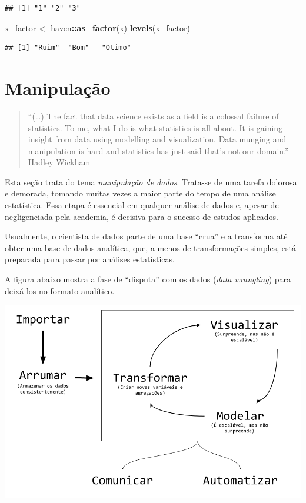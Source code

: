 \documentclass[
]{book}
\newenvironment{Shaded}{\begin{snugshade}}{\end{snugshade}}
\newcommand{\KeywordTok}[1]{\textcolor[rgb]{0.13,0.29,0.53}{\textbf{#1}}}
\newcommand{\NormalTok}[1]{#1}
\newcommand{\OperatorTok}[1]{\textcolor[rgb]{0.81,0.36,0.00}{\textbf{#1}}}
\newcommand{\StringTok}[1]{\textcolor[rgb]{0.31,0.60,0.02}{#1}}
\begin{document}
\begin{verbatim}
## [1] "1" "2" "3"
\end{verbatim}

\begin{Shaded}
\begin{Highlighting}[]
\NormalTok{x\_factor <{-}}\StringTok{ }\NormalTok{haven}\OperatorTok{::}\KeywordTok{as\_factor}\NormalTok{(x)}
\KeywordTok{levels}\NormalTok{(x\_factor)}
\end{Highlighting}
\end{Shaded}

\begin{verbatim}
## [1] "Ruim"  "Bom"   "Otimo"
\end{verbatim}

\hypertarget{manipulauxe7uxe3o}{%
\chapter{Manipulação}\label{manipulauxe7uxe3o}}

\begin{quote}
``(\ldots) The fact that data science exists as a field is a colossal failure of statistics. To me, what I do is what statistics is all about. It is gaining insight from data using modelling and visualization. Data munging and manipulation is hard and statistics has just said that's not our domain.'' - Hadley Wickham
\end{quote}

Esta seção trata do tema \emph{manipulação de dados}. Trata-se de uma tarefa dolorosa e demorada, tomando muitas vezes a maior parte do tempo de uma análise estatística. Essa etapa é essencial em qualquer análise de dados e, apesar de negligenciada pela academia, é decisiva para o sucesso de estudos aplicados.

Usualmente, o cientista de dados parte de uma base ``crua'' e a transforma até obter uma base de dados analítica, que, a menos de transformações simples, está preparada para passar por análises estatísticas.

A figura abaixo mostra a fase de ``disputa'' com os dados (\emph{data wrangling}) para deixá-los no formato analítico.

\begin{center}\includegraphics[width=13.31in]{img/manipulacao/ciclo-ciencia-de-dados} \end{center}
\end{document}
